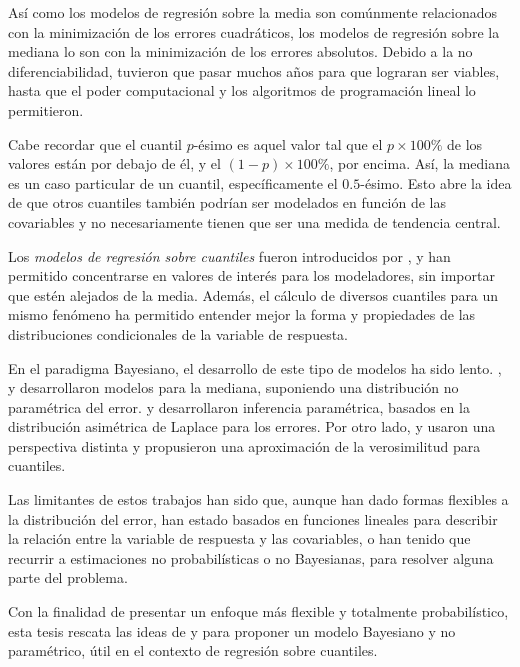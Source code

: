 As\'i como los modelos de regresi\'on sobre la media son com\'unmente relacionados con la minimizaci\'on de los errores cuadr\'aticos, los modelos de regresi\'on sobre la mediana lo son con la minimizaci\'on de los errores absolutos. Debido a la no diferenciabilidad, tuvieron que pasar muchos años para que lograran ser viables, hasta que el poder computacional y los algoritmos de programaci\'on lineal lo permitieron.

Cabe recordar que el cuantil $p$-\'esimo es aquel valor tal que el $p \times 100\%$ de los valores est\'an por debajo de \'el, y el $(1-p)\times 100\%$, por encima. As\'i, la mediana es un caso particular de un cuantil, espec\'ificamente el $0.5$-\'esimo. Esto abre la idea de que otros cuantiles tambi\'en podr\'ian ser modelados en funci\'on de las covariables y no necesariamente tienen que ser una medida de tendencia central. 

Los \textit{modelos de regresi\'on sobre cuantiles} fueron introducidos por \cite{Koenker_QuantReg}, y han permitido concentrarse en valores de inter\'es para los modeladores, sin importar que est\'en alejados de la media. Adem\'as, el c\'alculo de diversos cuantiles para un mismo fen\'omeno ha permitido entender mejor la forma y propiedades de las distribuciones condicionales de la variable de respuesta.

En el paradigma Bayesiano, el desarrollo de este tipo de modelos ha sido lento. \cite{Walker_BayesAccFail}, \cite{Kottas_BaySemiparamMed} y \cite{Hanson_PolyaTrees} desarrollaron modelos para la mediana, suponiendo una distribuci\'on no param\'etrica del error. \cite{Yu_BayQuantReg} y \cite{Tsionas_BayQuantInf} desarrollaron inferencia param\'etrica, basados en la distribuci\'on asim\'etrica de Laplace para los errores. Por otro lado, \cite{Lavine_LikeQuant} y \cite{Dunson_ApproxBayes} usaron una perspectiva distinta y propusieron una aproximaci\'on de la verosimilitud para cuantiles.

Las limitantes de estos trabajos han sido que, aunque han dado formas flexibles a la distribuci\'on del error, han estado basados en funciones lineales para describir la relaci\'on entre la variable de respuesta y las covariables, o han tenido que recurrir a estimaciones no probabil\'isticas o no Bayesianas, para resolver alguna parte del problema.

Con la finalidad de presentar un enfoque m\'as flexible y totalmente probabil\'istico, esta tesis rescata las ideas de \cite{Kottas_NotParamQuantReg} y \cite{Kottas_SemiparamQuantReg} para proponer un modelo Bayesiano y no param\'etrico, \'util en el contexto de regresi\'on sobre cuantiles.

\newpage